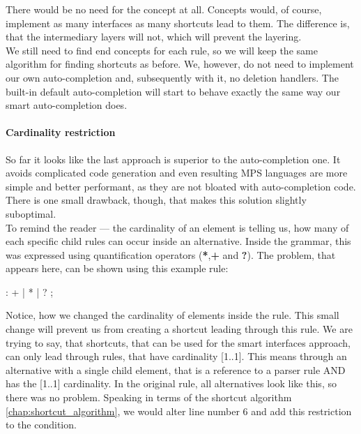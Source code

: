 There would be no need for the  concept at all.
Concepts would, of course, implement as many interfaces as many shortcuts lead to them.
The difference is, that the intermediary layers will not, which will prevent the layering.
\\

We still need to find end concepts for each rule, so we will keep the same algorithm for finding shortcuts as before.
We, however, do not need to implement our own auto-completion and, subsequently with it, no deletion handlers.
The built-in default auto-completion will start to behave exactly the same way our smart auto-completion does.

\paragraph{Cardinality restriction}
\label{chap:cardinality_restriction}

So far it looks like the last approach is superior to the auto-completion one.
It avoids complicated code generation and even resulting MPS languages are more simple and better performant, as they are not bloated with auto-completion code.
There is one small drawback, though, that makes this solution slightly suboptimal.
\\

To remind the reader --- the cardinality of an element is telling us, how many of each specific child rules can occur inside an alternative.
Inside the grammar, this was expressed using quantification operators (\textbf{*},\textbf{+} and \textbf{?}).
The problem, that appears here, can be shown using this example rule:

\begin{antlr}
      :   +
             |   *
             |   ?
             ;
\end{antlr}

Notice, how we changed the cardinality of elements inside the  rule.
This small change will prevent us from creating a shortcut leading through this rule.
We are trying to say, that shortcuts, that can be used for the smart interfaces approach, can only lead through rules, that have cardinality [1..1].
This means through an alternative with a single child element, that is a reference to a parser rule AND has the [1..1] cardinality.
In the original  rule, all alternatives look like this, so there was no problem.
Speaking in terms of the shortcut algorithm \ref{chap:shortcut_algorithm}, we would alter line number 6 and add this restriction to the condition.
\\

